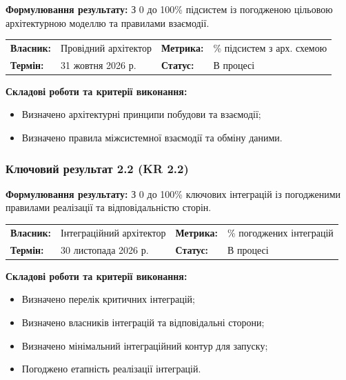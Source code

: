 \documentclass{article}
\begin{document}
\textbf{Формулювання результату:} З 0 до 100\% підсистем із погодженою цільовою архітектурною моделлю та правилами взаємодії.

\noindent\begin{tabular}{@{}p{2.2cm}p{4.5cm}p{2.2cm}p{4.5cm}@{}}
\toprule
\textbf{Власник:} & Провідний архітектор & \textbf{Метрика:} & \% підсистем з арх. схемою \\
\textbf{Термін:} & 31 жовтня 2026 р. & \textbf{Статус:} & В процесі \\
\bottomrule
\end{tabular}

\vspace{10pt}
\textbf{Складові роботи та критерії виконання:}
\begin{itemize}
    \item Визначено архітектурні принципи побудови та взаємодії;
    \item Визначено правила міжсистемної взаємодії та обміну даними.
\end{itemize}

\subsubsection{Ключовий результат 2.2 (KR 2.2)}

\textbf{Формулювання результату:} З 0 до 100\% ключових інтеграцій із погодженими правилами реалізації та відповідальністю сторін.

\noindent\begin{tabular}{@{}p{2.2cm}p{4.5cm}p{2.2cm}p{4.5cm}@{}}
\toprule
\textbf{Власник:} & Інтеграційний архітектор & \textbf{Метрика:} & \% погоджених інтеграцій \\
\textbf{Термін:} & 30 листопада 2026 р. & \textbf{Статус:} & В процесі \\
\bottomrule
\end{tabular}

\vspace{10pt}
\textbf{Складові роботи та критерії виконання:}
\begin{itemize}
    \item Визначено перелік критичних інтеграцій;
    \item Визначено власників інтеграцій та відповідальні сторони;
    \item Визначено мінімальний інтеграційний контур для запуску;
    \item Погоджено етапність реалізації інтеграцій.
\end{itemize}
\end{document}
